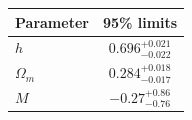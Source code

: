 \begin{tabular} { l  c}

 Parameter &  95\% limits\\
\hline
{\boldmath$h              $} & $0.696^{+0.021}_{-0.022}   $\\

{\boldmath$Ω_m            $} & $0.284^{+0.018}_{-0.017}   $\\

{\boldmath$M              $} & $-0.27^{+0.86}_{-0.76}     $\\
\hline
\end{tabular}